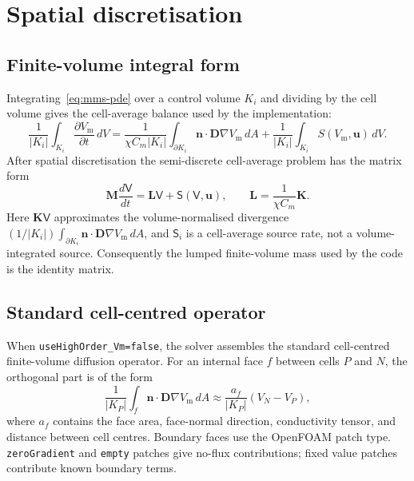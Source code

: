 \documentclass[11pt,a4paper]{article}
\newcommand{\code}[1]{\texttt{\small #1}}
\newcommand{\Vm}{V_{\text{m}}}
\newcommand{\Dten}{\mathbf{D}}
\newcommand{\grad}{\nabla}
\newcommand{\Mmass}{\mathbf{M}}
\newcommand{\Kstif}{\mathbf{K}}
\newcommand{\Lop}{\mathbf{L}}
\begin{document}
\section{Spatial discretisation}

\subsection{Finite-volume integral form}

Integrating~\eqref{eq:mms-pde} over a control volume $K_i$ and dividing by
the cell volume gives the cell-average balance used by the implementation:
\begin{equation}
  \frac{1}{|K_i|}\int_{K_i}\frac{\partial \Vm}{\partial t}\,dV
  =
  \frac{1}{\chi C_m|K_i|}
  \int_{\partial K_i}\mathbf{n}\cdot\Dten\grad\Vm\,dA
  +
  \frac{1}{|K_i|}\int_{K_i}S(\Vm,\mathbf{u})\,dV.
  \label{eq:fv-integral}
\end{equation}
After spatial discretisation the semi-discrete cell-average problem has the
matrix form
\begin{equation}
  \Mmass \frac{d\mathsf{V}}{dt}
  =
  \Lop \mathsf{V}
  +
  \mathsf{S}(\mathsf{V},\mathbf{u}),
  \qquad
  \Lop = \frac{1}{\chi C_m}\Kstif.
  \label{eq:semidiscrete}
\end{equation}
Here $\Kstif\mathsf{V}$ approximates the volume-normalised divergence
$(1/|K_i|)\int_{\partial K_i}\mathbf{n}\cdot\Dten\grad\Vm\,dA$, and
$\mathsf{S}_i$ is a cell-average source rate, not a volume-integrated source.
Consequently the lumped finite-volume mass used by the code is the identity
matrix.

\subsection{Standard cell-centred operator}
\label{sec:std-operator}

When \code{useHighOrder\_Vm=false}, the solver assembles the standard
cell-centred finite-volume diffusion operator. For an internal face $f$ between
cells $P$ and $N$, the orthogonal part is of the form
\begin{equation}
  \label{eq:orthoflux}
  \frac{1}{|K_P|}\int_f \mathbf{n}\cdot\Dten\grad\Vm\,dA
  \approx
  \frac{a_f}{|K_P|}(V_N-V_P),
\end{equation}
where $a_f$ contains the face area, face-normal direction, conductivity tensor,
and distance between cell centres. Boundary faces use the OpenFOAM patch type.
\code{zeroGradient} and \code{empty} patches give no-flux contributions; fixed
value patches contribute known boundary terms.
\end{document}
